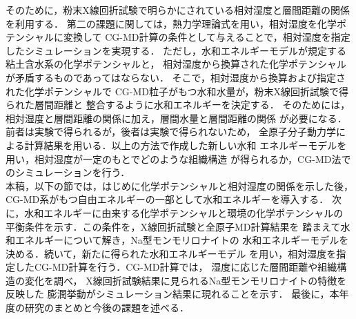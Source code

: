 そのために，粉末X線回折試験で明らかにされている相対湿度と層間距離の関係を利用する．
第二の課題に関しては，熱力学理論式を用い，相対湿度を化学ポテンシャルに変換して
CG-MD計算の条件として与えることで，相対湿度を指定したシミュレーションを実現する．
ただし，水和エネルギーモデルが規定する粘土含水系の化学ポテンシャルと，
相対湿度から換算された化学ポテンシャルが矛盾するものであってはならない．
そこで，相対湿度から換算および指定された化学ポテンシャルで
CG-MD粒子がもつ水和水量が，粉末X線回折試験で得られた層間距離と
整合するように水和エネルギーを決定する．
%
そのためには，相対湿度と層間距離の関係に加え，層間水量と層間距離の関係
が必要になる．前者は実験で得られるが，後者は実験で得られないため，
全原子分子動力学による計算結果を用いる．以上の方法で作成した新しい水和
エネルギーモデルを用い，相対湿度が一定のもとでどのような組織構造
が得られるか，CG-MD法でのシミュレーションを行う．\\
\hspace{\parindent}
本稿，以下の節では，はじめに化学ポテンシャルと相対湿度の関係を示した後，
CG-MD系がもつ自由エネルギーの一部として水和エネルギーを導入する．
次に，水和エネルギーに由来する化学ポテンシャルと環境の化学ポテンシャルの
平衡条件を示す．この条件を，X線回折試験と全原子MD計算結果を
踏まえて水和エネルギーについて解き，Na型モンモリロナイトの
水和エネルギーモデルを決める．続いて，新たに得られた水和エネルギーモデル
を用い，相対湿度を指定したCG-MD計算を行う．CG-MD計算では，
湿度に応じた層間距離や組織構造の変化を調べ，
X線回折試験結果に見られるNa型モンモリロナイトの特徴を反映した
膨潤挙動がシミュレーション結果に現れることを示す．
最後に，本年度の研究のまとめと今後の課題を述べる．
